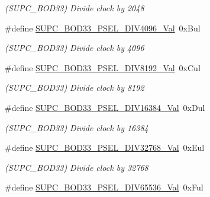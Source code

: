 \begin{DoxyCompactItemize}
\begin{DoxyCompactList}\small\item\em (S\+U\+P\+C\+\_\+\+B\+O\+D33) Divide clock by 2048 \end{DoxyCompactList}\item 
\hypertarget{group___s_a_m_l21___s_u_p_c_gadfeaf2b4786ae11fd3abf39d094b2b3e}{}\#define \hyperlink{group___s_a_m_l21___s_u_p_c_gadfeaf2b4786ae11fd3abf39d094b2b3e}{S\+U\+P\+C\+\_\+\+B\+O\+D33\+\_\+\+P\+S\+E\+L\+\_\+\+D\+I\+V4096\+\_\+\+Val}~0x\+Bul\label{group___s_a_m_l21___s_u_p_c_gadfeaf2b4786ae11fd3abf39d094b2b3e}

\begin{DoxyCompactList}\small\item\em (S\+U\+P\+C\+\_\+\+B\+O\+D33) Divide clock by 4096 \end{DoxyCompactList}\item 
\hypertarget{group___s_a_m_l21___s_u_p_c_gad607b6a115fde5b6a6a24d6a448e9173}{}\#define \hyperlink{group___s_a_m_l21___s_u_p_c_gad607b6a115fde5b6a6a24d6a448e9173}{S\+U\+P\+C\+\_\+\+B\+O\+D33\+\_\+\+P\+S\+E\+L\+\_\+\+D\+I\+V8192\+\_\+\+Val}~0x\+Cul\label{group___s_a_m_l21___s_u_p_c_gad607b6a115fde5b6a6a24d6a448e9173}

\begin{DoxyCompactList}\small\item\em (S\+U\+P\+C\+\_\+\+B\+O\+D33) Divide clock by 8192 \end{DoxyCompactList}\item 
\hypertarget{group___s_a_m_l21___s_u_p_c_gab6f5f059bffd60fb9f4798a4c356d61f}{}\#define \hyperlink{group___s_a_m_l21___s_u_p_c_gab6f5f059bffd60fb9f4798a4c356d61f}{S\+U\+P\+C\+\_\+\+B\+O\+D33\+\_\+\+P\+S\+E\+L\+\_\+\+D\+I\+V16384\+\_\+\+Val}~0x\+Dul\label{group___s_a_m_l21___s_u_p_c_gab6f5f059bffd60fb9f4798a4c356d61f}

\begin{DoxyCompactList}\small\item\em (S\+U\+P\+C\+\_\+\+B\+O\+D33) Divide clock by 16384 \end{DoxyCompactList}\item 
\hypertarget{group___s_a_m_l21___s_u_p_c_ga779c601dbb7b47718a6d701958f823ff}{}\#define \hyperlink{group___s_a_m_l21___s_u_p_c_ga779c601dbb7b47718a6d701958f823ff}{S\+U\+P\+C\+\_\+\+B\+O\+D33\+\_\+\+P\+S\+E\+L\+\_\+\+D\+I\+V32768\+\_\+\+Val}~0x\+Eul\label{group___s_a_m_l21___s_u_p_c_ga779c601dbb7b47718a6d701958f823ff}

\begin{DoxyCompactList}\small\item\em (S\+U\+P\+C\+\_\+\+B\+O\+D33) Divide clock by 32768 \end{DoxyCompactList}\item 
\hypertarget{group___s_a_m_l21___s_u_p_c_gaa28f950cc527b402bcd9e110ec4aa4b4}{}\#define \hyperlink{group___s_a_m_l21___s_u_p_c_gaa28f950cc527b402bcd9e110ec4aa4b4}{S\+U\+P\+C\+\_\+\+B\+O\+D33\+\_\+\+P\+S\+E\+L\+\_\+\+D\+I\+V65536\+\_\+\+Val}~0x\+Ful\label{group___s_a_m_l21___s_u_p_c_gaa28f950cc527b402bcd9e110ec4aa4b4}


\end{DoxyCompactItemize}
